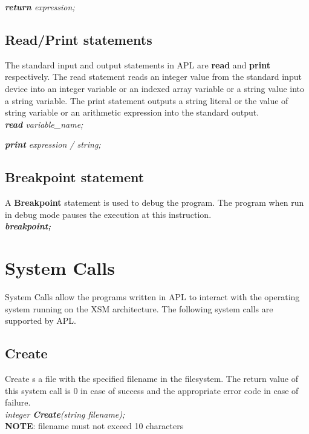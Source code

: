 \documentclass[11pt]{article}
\begin{document}
\textit{\textbf{return} expression;}


\subsection{Read/Print statements}
The standard input and output statements in APL are \textbf{read} and \textbf{print} respectively. The read statement reads an integer value from the standard input device into an integer variable or an indexed array variable or a string value into a string variable. The print statement outputs a string literal or the value of string variable or an arithmetic expression  into the standard output.\\

\textit{\textbf{read} variable\_name;}

\textit{\textbf{print} expression / string;}


\subsection{Breakpoint statement}
A \textbf{Breakpoint} statement is used to debug the program. The program when run in debug mode pauses the execution at this instruction.\\

   \textit{ \textbf{breakpoint;}}



\section{System Calls}

System Calls allow the programs written in APL to interact with the operating system running on the XSM architecture. The following system calls are supported by APL.



\subsection{Create}
Create s a file with the specified filename in the filesystem. The return value of this system call is 0 in case of success and the appropriate error code in case of failure.
\\

\textit{integer \textbf{Create}(string filename);}\\

\textbf{NOTE}: filename must not exceed 10 characters
\end{document}
